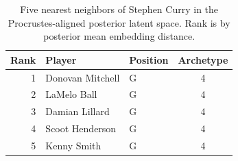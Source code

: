 \begin{table}[htbp]
  \centering\small
  \begin{tabular}{rllc}
    \toprule
    Rank & Player & Position & Archetype \\
    \midrule
    1 & Donovan Mitchell & G & 4 \\
    2 & LaMelo Ball & G & 4 \\
    3 & Damian Lillard & G & 4 \\
    4 & Scoot Henderson & G & 4 \\
    5 & Kenny Smith & G & 4 \\
    \bottomrule
  \end{tabular}
  \caption{Five nearest neighbors of Stephen Curry in the Procrustes-aligned posterior latent space. Rank is by posterior mean embedding distance.}
  \label{tab:Stephen_Curry_neighbors}
\end{table}

